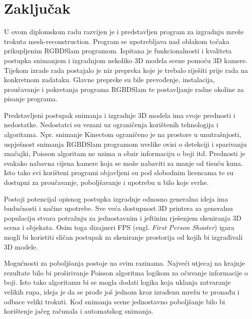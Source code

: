 \newpage
\setcounter{figure}{0}

\section{Zaključak} %
\label{sec:Zaključak}

U ovom diplomskom radu razvijen je i predstavljen program za izgradnju
mreže trokuta mesh-reconstruction. Program se upotrebljava nad oblakom
točaka prikupljenim RGBDSlam programom. Ispitana je funkcionalnosti i
kvaliteta postupka snimanjem i izgradnjom nekoliko 3D modela scene
pomoću 3D kamere. Tijekom izrade rada postajalo je niz prepreka koje je
trebalo riješiti prije rada na konkretnom zadataku. Glavne prepreke su
bile prevođenje, instalacija, proučavanje i pokretanja programa RGBDSlam
te postavljanje radne okoline za pisanje programa. 

Predstavljeni postupak snimanja i izgradnje 3D modela ima svoje
prednosti i nedostatke. Nedostatci su vezani uz ograničenja korištenih
tehnologija i algoritama. Npr. snimanje Kinectom ograničeno je na
prostore u unutrašnjosti, uspješnost snimanja RGBDSlam programom uvelike
ovisi o detekciji i sparivanju značajki, Poisson algoritam ne uzima u
obzir informaciju o boji itd. Prednosti je svakako nabavna cijena
kamere koja se može nabaviti za manje od tisuću kuna. Isto tako svi
korišteni programi objavljeni su pod slobodnim licencama te su dostupni
za proučavanje, poboljšavanje i upotrebu u bilo koje svrhe.  

Postoji potencijal opisnog postupka izgradnje odnosno generalna ideja
ima budućnosti i načine upotrebe. Sve veća dostupnost 3D printera za
generalnu populaciju stvara potražnju za jednostavnim i jeftinim
rješenjem skeniranja 3D scena i objekata. Osim toga dizajneri FPS (engl.
\textit{First Person Shooter}) igara mogli bi koristiti sličan postupak
za skeniranje prostorija od kojih bi izgrađivali 3D modele.

Mogućnosti za poboljšanja postoje na svim razinama. Najveći utjecaj na
krajnje rezultate bilo bi proširivanje Poisson algoritma logikom za
očuvanje informacije o boji. Isto tako algoritamu bi se mogla dodati
logika koja uklanja zatvaranje velikih rupa, ideja je da se prođe još
jednom kroz izrađenu mrežu te pronađu i odbace veliki trokuti. Kod
snimanja scene jednostavno poboljšanje bilo bi korištenje jačeg računala
i automatskog snimanja.

